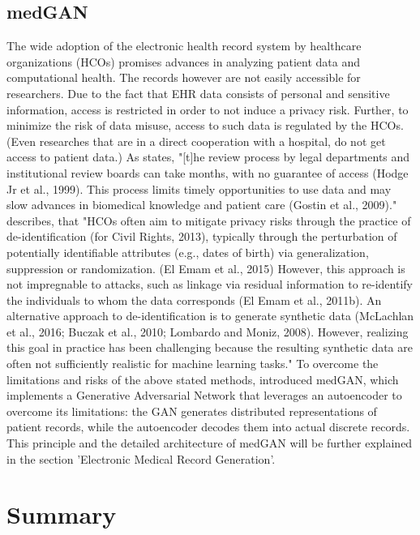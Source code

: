 \documentclass[11pt, a4paper]{book}
\begin{document}
\subsection{medGAN}
The wide adoption of the electronic health record system by healthcare organizations (HCOs) promises advances in analyzing patient data and computational health. The records however are not easily accessible for researchers. Due to the fact that EHR data consists of personal and sensitive information, access is restricted in order to not induce a privacy risk. Further, to minimize the risk of data misuse, access to such data is regulated by the HCOs. \cite{Choi2017}
(Even researches that are in a direct cooperation with a hospital, do not get access to patient data.)
 As \cite{Choi2017} states, "[t]he review process by legal departments and institutional review boards can take months, with no guarantee of access (Hodge Jr et al., 1999). This process limits timely opportunities to use data and may slow advances in biomedical knowledge and patient care (Gostin et al., 2009)."
 \cite{Choi2017} describes, that "HCOs often aim to mitigate privacy risks through the practice of de-identification (for Civil Rights, 2013), typically through the perturbation of potentially identifiable attributes (e.g., dates of birth) via generalization, suppression or randomization. (El Emam et al., 2015) However, this approach is not impregnable to attacks, such as linkage via residual information to re-identify the individuals to whom the data corresponds (El Emam et al., 2011b). An alternative approach to de-identification is to generate synthetic data (McLachlan et al., 2016; Buczak et al., 2010; Lombardo and Moniz, 2008). However, realizing this goal in practice has been challenging because the resulting synthetic data are often not sufficiently realistic for machine learning tasks."  \cite{Choi2017}
 To overcome the limitations and risks of the above stated methods, \cite{Choi2017} introduced medGAN, which implements a Generative Adversarial Network that leverages an autoencoder to overcome its limitations: the GAN generates distributed representations of patient records, while the autoencoder decodes them into actual discrete records.
 This principle and the detailed architecture of medGAN will be further explained in the section 'Electronic Medical Record Generation'.

\section{Summary}
\end{document}
